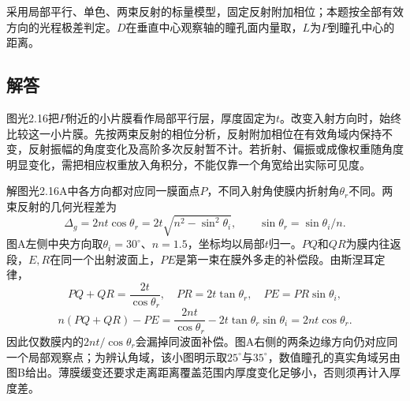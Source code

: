 \documentclass[UTF8,fontset=fandol,a4paper,11pt]{ctexart}
\newcommand{\figcaption}[1]{\par\vspace{2pt}{\small\color{muted}#1}\par}
\begin{document}
采用局部平行、单色、两束反射的标量模型，固定反射附加相位；本题按全部有效方向的光程极差判定。$D$在垂直中心观察轴的瞳孔面内量取，$L$为$P$到瞳孔中心的距离。
\begin{center}\begin{minipage}{.98\linewidth}\centering
{}
\figcaption{图光2.16\quad 楔形膜在观察点附近的局部平行近似}
\end{minipage}\end{center}

\subsection*{解答}


图光2.16把$P$附近的小片膜看作局部平行层，厚度固定为$t$。改变入射方向时，始终比较这一小片膜。先按两束反射的相位分析，反射附加相位在有效角域内保持不变，反射振幅的角度变化及高阶多次反射暂不计。若折射、偏振或成像权重随角度明显变化，需把相应权重放入角积分，不能仅靠一个角宽给出实际可见度。

解图光2.16A中各方向都对应同一膜面点$P$，不同入射角使膜内折射角$\theta_r$不同。两束反射的几何光程差为
\[
\Delta_g=2nt\cos\theta_r
=2t\sqrt{n^2-\sin^2\theta_i},
\qquad \sin\theta_r=\sin\theta_i/n.
\]
图A左侧中央方向取$\theta_i=30^\circ$、$n=1.5$，坐标均以局部$t$归一。$PQ$和$QR$为膜内往返段，$E,R$在同一个出射波面上，$PE$是第一束在膜外多走的补偿段。由斯涅耳定律，
\[
PQ+QR=\frac{2t}{\cos\theta_r},\quad
PR=2t\tan\theta_r,\quad PE=PR\sin\theta_i,
\]
\[
n(PQ+QR)-PE
=\frac{2nt}{\cos\theta_r}-2t\tan\theta_r\sin\theta_i
=2nt\cos\theta_r.
\]
因此仅数膜内的$2nt/\cos\theta_r$会漏掉同波面补偿。图A右侧的两条边缘方向仍对应同一个局部观察点；为辨认角域，该小图明示取$25^\circ$与$35^\circ$，数值瞳孔的真实角域另由图B给出。薄膜缓变还要求走离距离覆盖范围内厚度变化足够小，否则须再计入厚度差。
\end{document}
